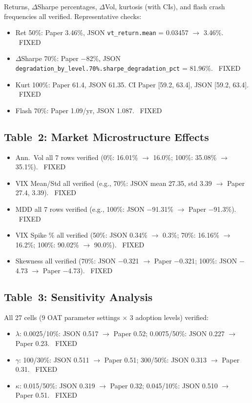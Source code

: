 \documentclass[12pt,a4paper]{article}
\newcommand{\FIXED}{\textcolor{okgreen}{\checkmark\ FIXED}}
\begin{document}
\noindent Returns, $\Delta$Sharpe percentages, $\Delta$Vol, kurtosis (with CIs), and flash crash frequencies all verified. Representative checks:

\begin{itemize}[nosep]
  \item Ret 50\%: Paper 3.46\%, JSON \texttt{vt\_return.mean} = 0.03457 $\to$ 3.46\%. \FIXED
  \item $\Delta$Sharpe 70\%: Paper $-$82\%, JSON \texttt{degradation\_by\_level.70\%.sharpe\_degradation\_pct} = 81.96\%. \FIXED
  \item Kurt 100\%: Paper 61.4, JSON 61.35. CI Paper [59.2, 63.4], JSON [59.2, 63.4]. \FIXED
  \item Flash 70\%: Paper 1.09/yr, JSON 1.087. \FIXED
\end{itemize}

\subsection*{Table~2: Market Microstructure Effects}

\begin{itemize}[nosep]
  \item Ann.\ Vol all 7 rows verified (0\%: 16.01\% $\to$ 16.0\%; 100\%: 35.08\% $\to$ 35.1\%). \FIXED
  \item VIX Mean/Std all verified (e.g., 70\%: JSON mean 27.35, std 3.39 $\to$ Paper 27.4, 3.39). \FIXED
  \item MDD all 7 rows verified (e.g., 100\%: JSON $-$91.31\% $\to$ Paper $-$91.3\%). \FIXED
  \item VIX Spike \% all verified (50\%: JSON 0.34\% $\to$ 0.3\%; 70\%: 16.16\% $\to$ 16.2\%; 100\%: 90.02\% $\to$ 90.0\%). \FIXED
  \item Skewness all verified (70\%: JSON $-$0.321 $\to$ Paper $-$0.321; 100\%: JSON $-$4.73 $\to$ Paper $-$4.73). \FIXED
\end{itemize}

\subsection*{Table~3: Sensitivity Analysis}

All 27 cells (9 OAT parameter settings $\times$ 3 adoption levels) verified:

\begin{itemize}[nosep]
  \item $\lambda$: 0.0025/10\%: JSON 0.517 $\to$ Paper 0.52; 0.0075/50\%: JSON 0.227 $\to$ Paper 0.23. \FIXED
  \item $\gamma$: 100/30\%: JSON 0.511 $\to$ Paper 0.51; 300/50\%: JSON 0.313 $\to$ Paper 0.31. \FIXED
  \item $\kappa$: 0.015/50\%: JSON 0.319 $\to$ Paper 0.32; 0.045/10\%: JSON 0.510 $\to$ Paper 0.51. \FIXED
\end{itemize}
\end{document}
